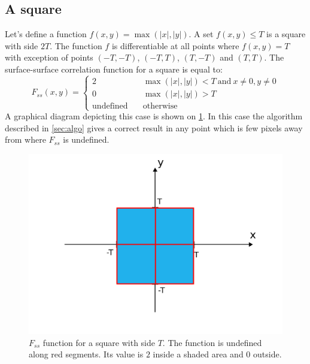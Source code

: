 \documentclass[reprint,amsmath,amssymb,aps,pre,showkeys,showpacs]{revtex4-1}
\begin{document}
\subsection{A square}
Let's define a function $f(x, y) = \max(|x|, |y|)$. A set $f(x, y) \le T$ is a
square with side $2T$. The function $f$ is differentiable at all points where
$f(x, y) = T$ with exception of points $(-T, -T)$, $(-T, T)$, $(T, -T)$ and
$(T, T)$. The surface-surface correlation function for a square is equal to:
\begin{equation*}
  F_{ss}(x, y) = \left\{
  \begin{array}{ll}
    2 & \quad \max(|x|, |y|) < T \ \text{and}\ x\ne0, y\ne0 \\
    0 & \quad \max(|x|, |y|) > T \\
    \text{undefined} & \quad \text{otherwise}
  \end{array}
  \right.
\end{equation*}
A graphical diagram depicting this case is shown on \cref{fig:fss-square}. In
this case the algorithm described in \cref{sec:algo} gives a correct result in
any point which is few pixels away from where $F_{ss}$ is undefined.
\begin{figure}
  \centering
  \includegraphics[width=0.8\linewidth]{images/fss-square.png}
  \caption[]{$F_{ss}$ function for a square with side $T$. The function is
    undefined along red segments. Its value is $2$ inside a shaded area and $0$
    outside.}
  \label{fig:fss-square}
\end{figure}
\end{document}
